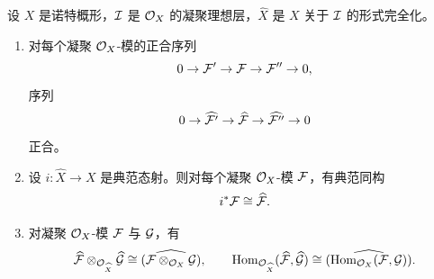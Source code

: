 \begin{proposition}\label{it:1.5.13}
设 $X$ 是诺特概形，$\mathcal{I}$ 是 $\mathcal{O}_X$ 的凝聚理想层，$\widehat X$ 是 $X$ 关于 $\mathcal{I}$ 的形式完全化。
\begin{enumerate}[label=(\roman*),leftmargin=2.8em]
  \item 对每个凝聚 $\mathcal{O}_X$-模的正合序列
  \[
  0\to\mathcal{F}'\to\mathcal{F}\to\mathcal{F}''\to 0,
  \]
  序列
  \[
  0\to\widehat{\mathcal{F}'}\to\widehat{\mathcal{F}}\to\widehat{\mathcal{F}''}\to 0
  \]
  正合。
  \item 设 $i\colon\widehat X\to X$ 是典范态射。则对每个凝聚 $\mathcal{O}_X$-模 $\mathcal{F}$，有典范同构
  \[
  i^*\mathcal{F}\cong\widehat{\mathcal{F}}.
  \]
  \item 对凝聚 $\mathcal{O}_X$-模 $\mathcal{F}$ 与 $\mathcal{G}$，有
  \[
  \widehat{\mathcal{F}}\otimes_{\mathcal{O}_{\widehat X}}\widehat{\mathcal{G}}\cong\widehat{(\mathcal{F}\otimes_{\mathcal{O}_X}\mathcal{G})},\qquad
  \operatorname{Hom}_{\mathcal{O}_{\widehat X}}(\widehat{\mathcal{F}},\widehat{\mathcal{G}})\cong\widehat{(\operatorname{Hom}_{\mathcal{O}_X}(\mathcal{F},\mathcal{G}))}.
  \]
\end{enumerate}
\end{proposition}

